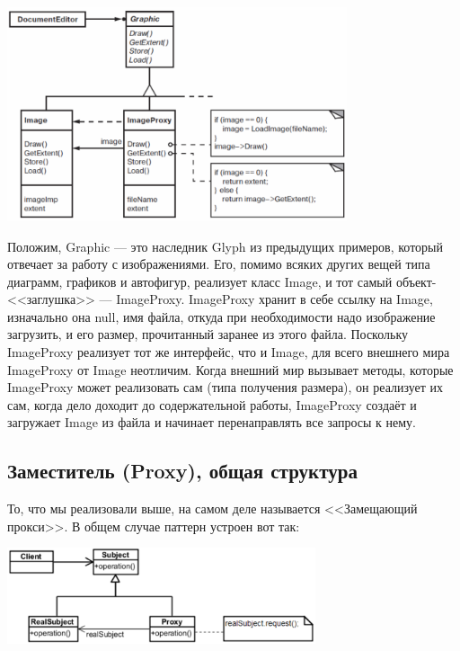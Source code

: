 \documentclass{../text-style}
\begin{document}
\begin{center}
    \includegraphics[width=0.75\textwidth]{proxyExampleClassDiagram.png}
\end{center}

Положим, Graphic --- это наследник Glyph из предыдущих примеров, который отвечает за работу с изображениями. Его, помимо всяких других вещей типа диаграмм, графиков и автофигур, реализует класс Image, и тот самый объект-<<заглушка>> --- ImageProxy. ImageProxy хранит в себе ссылку на Image, изначально она null, имя файла, откуда при необходимости надо изображение загрузить, и его размер, прочитанный заранее из этого файла. Поскольку ImageProxy реализует тот же интерфейс, что и Image, для всего внешнего мира ImageProxy от Image неотличим. Когда внешний мир вызывает методы, которые ImageProxy может реализовать сам (типа получения размера), он реализует их сам, когда дело доходит до содержательной работы, ImageProxy создаёт и загружает Image из файла и начинает перенаправлять все запросы к нему.

\subsection{Заместитель (Proxy), общая структура}

То, что мы реализовали выше, на самом деле называется <<Замещающий прокси>>. В общем случае паттерн устроен вот так:

\begin{center}
    \includegraphics[width=0.68\textwidth]{proxy.png}
\end{center}
\end{document}

